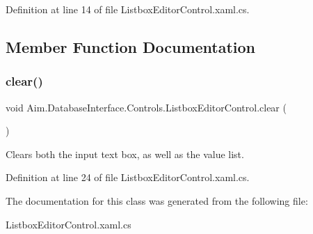 Definition at line 14 of file Listbox\+Editor\+Control.\+xaml.\+cs.



\subsection{Member Function Documentation}
\mbox{\label{class_aim_1_1_database_interface_1_1_controls_1_1_listbox_editor_control_a2ba9d7b1099ff6393681e812dab6edd3}} 
\subsubsection{\texorpdfstring{clear()}{clear()}}
{\footnotesize\ttfamily void Aim.\+Database\+Interface.\+Controls.\+Listbox\+Editor\+Control.\+clear (\begin{DoxyParamCaption}{ }\end{DoxyParamCaption})\hspace{0.3cm}{\ttfamily [inline]}}



Clears both the input text box, as well as the value list. 



Definition at line 24 of file Listbox\+Editor\+Control.\+xaml.\+cs.



The documentation for this class was generated from the following file\+:\begin{DoxyCompactItemize}
\item 
Listbox\+Editor\+Control.\+xaml.\+cs\end{DoxyCompactItemize}
